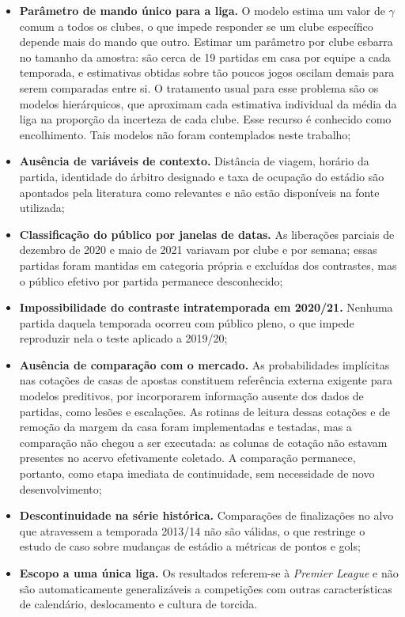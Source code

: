 \begin{itemize}
  \item \textbf{Parâmetro de mando único para a liga.} O modelo estima um valor
    de $\gamma$ comum a todos os clubes, o que impede responder se um clube
    específico depende mais do mando que outro. Estimar um parâmetro por clube
    esbarra no tamanho da amostra: são cerca de 19 partidas em casa por equipe a
    cada temporada, e estimativas obtidas sobre tão poucos jogos oscilam
    demais para serem comparadas entre si. O tratamento usual para esse problema
    são os modelos hierárquicos, que aproximam cada estimativa individual da
    média da liga na proporção da incerteza de cada clube. Esse recurso é
    conhecido como encolhimento. Tais modelos não foram contemplados neste trabalho;
  \item \textbf{Ausência de variáveis de contexto.} Distância de viagem, horário
    da partida, identidade do árbitro designado e taxa de ocupação do estádio são
    apontados pela literatura como relevantes e não estão disponíveis na fonte
    utilizada;
  \item \textbf{Classificação do público por janelas de datas.} As liberações
    parciais de dezembro de 2020 e maio de 2021 variavam por clube e por semana;
    essas partidas foram mantidas em categoria própria e excluídas dos
    contrastes, mas o público efetivo por partida permanece desconhecido;
  \item \textbf{Impossibilidade do contraste intratemporada em 2020/21.}
    Nenhuma partida daquela temporada ocorreu com público pleno, o que impede
    reproduzir nela o teste aplicado a 2019/20;
  \item \textbf{Ausência de comparação com o mercado.} As probabilidades
    implícitas nas cotações de casas de apostas constituem referência externa
    exigente para modelos preditivos, por incorporarem informação ausente dos
    dados de partidas, como lesões e escalações. As rotinas de leitura dessas
    cotações e de remoção da margem da casa foram implementadas e testadas, mas
    a comparação não chegou a ser executada: as colunas de cotação não estavam
    presentes no acervo efetivamente coletado. A comparação permanece, portanto,
    como etapa imediata de continuidade, sem necessidade de novo
    desenvolvimento;
  \item \textbf{Descontinuidade na série histórica.} Comparações de finalizações
    no alvo que atravessem a temporada 2013/14 não são válidas, o que restringe
    o estudo de caso sobre mudanças de estádio a métricas de pontos e gols;
  \item \textbf{Escopo a uma única liga.} Os resultados referem-se à
    \textit{Premier League} e não são automaticamente generalizáveis a
    competições com outras características de calendário, deslocamento e cultura
    de torcida.
\end{itemize}

